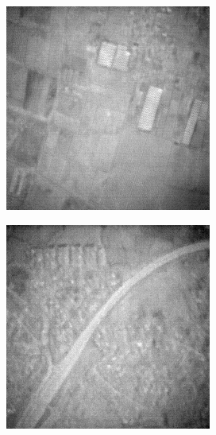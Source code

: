 \begin{figure}[H]
\begin{subfigure}[b]{0.24\textwidth}
    \end{subfigure}
    \hfill
    \begin{subfigure}[b]{0.24\textwidth}
        \centering
        \includegraphics[width=\textwidth]{../figs/outputs/petit/24.png}
    \end{subfigure}
    \hfill
    \begin{subfigure}[b]{0.24\textwidth}
        \centering
        \includegraphics[width=\textwidth]{../figs/outputs/mono/508.png}
    \end{subfigure}    
    

\end{figure}
